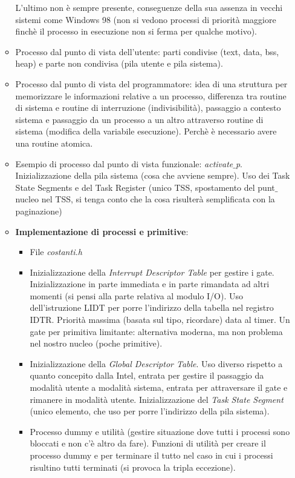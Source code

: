 \documentclass[11pt]{report}
\theoremstyle{definition}
\begin{document}
\begin{itemize}
\begin{itemize}
\begin{itemize}
		\end{itemize}
		L'ultimo non è sempre presente, conseguenze della sua assenza in vecchi sistemi come Windows 98 (non si vedono processi di priorità maggiore finchè il processo in esecuzione non si ferma per qualche motivo).
		\item Processo dal punto di vista dell'utente: parti condivise (text, data, bss, heap) e parte non condivisa (pila utente e pila sistema).
		\item Processo dal punto di vista del programmatore: idea di una struttura per memorizzare le informazioni relative a un processo, differenza tra routine di sistema e routine di interruzione (indivisibilità), passaggio a contesto sistema e passaggio da un processo a un altro attraverso routine di sistema (modifica della variabile esecuzione). Perchè è necessario avere una routine atomica.
		\item Esempio di processo dal punto di vista funzionale: \emph{activate$\_$p}. Inizializzazione della pila sistema (cosa che avviene sempre). Uso dei Task State Segments e del Task Register (unico TSS, spostamento del punt$\_$nucleo nel TSS, si tenga conto che la cosa risulterà semplificata con la paginazione)
		\item \textbf{Implementazione di processi e primitive}:
		\begin{itemize}
			\item File \emph{costanti.h}
			\item Inizializzazione della \emph{Interrupt Descriptor Table} per gestire i gate. Inizializzazione in parte immediata e in parte rimandata ad altri momenti (si pensi alla parte relativa al modulo I/O). Uso dell'istruzione LIDT per porre l'indirizzo della tabella nel registro IDTR. Priorità massima (basata sul tipo, ricordare) data al timer. Un gate per primitiva limitante: alternativa moderna, ma non problema nel nostro nucleo (poche primitive).
			\item Inizializzazione della \emph{Global Descriptor Table}. Uso diverso rispetto a quanto concepito dalla Intel, entrata per gestire il passaggio da modalità utente a modalità sistema, entrata per attraversare il gate e rimanere in modalità utente. Inizializzazione del \emph{Task State Segment} (unico elemento, che uso per porre l'indirizzo della pila sistema).
			\item Processo dummy e utilità (gestire situazione dove tutti i processi sono bloccati e non c'è altro da fare). Funzioni di utilità per creare il processo dummy e per terminare il tutto nel caso in cui i processi risultino tutti terminati (si provoca la tripla eccezione).

\end{itemize}
\end{itemize}
\end{itemize}
\end{document}
